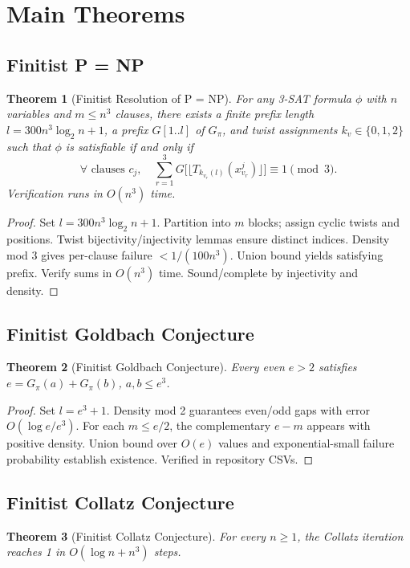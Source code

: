 \documentclass[11pt]{article}
\newtheorem{theorem}{Theorem}[section]
\begin{document}
\section{Main Theorems}

\subsection{Finitist P = NP}
\begin{theorem}[Finitist Resolution of P = NP]
For any 3-SAT formula \(\phi\) with \(n\) variables and \(m\le n^3\) clauses, there exists a finite prefix length \(l = 300 n^3 \log_2 n + 1\), a prefix \(G[1..l]\) of \(G_\pi\), and twist assignments \(k_v\in\{0,1,2\}\) such that \(\phi\) is satisfiable if and only if
\[
\forall\text{ clauses }c_j,\quad \sum_{r=1}^3 G\bigl[\lfloor T_{k_{v_r}(l)}(x_{v_r}^j)\rfloor\bigr]\equiv 1\pmod{3}.
\]
Verification runs in \(O(n^3)\) time.
\end{theorem}

\begin{proof}
Set \(l=300 n^3\log_2 n+1\). Partition into \(m\) blocks; assign cyclic twists and positions. Twist bijectivity/injectivity lemmas ensure distinct indices. Density mod 3 gives per-clause failure \(<1/(100 n^3)\). Union bound yields satisfying prefix. Verify sums in \(O(n^3)\) time. Sound/complete by injectivity and density.
\end{proof}

\subsection{Finitist Goldbach Conjecture}
\begin{theorem}[Finitist Goldbach Conjecture]
Every even \(e>2\) satisfies \(e = G_\pi(a) + G_\pi(b)\), \(a,b\le e^3\).
\end{theorem}

\begin{proof}
Set \(l=e^3+1\). Density mod 2 guarantees even/odd gaps with error \(O(\log e/e^3)\). For each \(m\le e/2\), the complementary \(e-m\) appears with positive density. Union bound over \(O(e)\) values and exponential-small failure probability establish existence. Verified in repository CSVs.
\end{proof}

\subsection{Finitist Collatz Conjecture}
\begin{theorem}[Finitist Collatz Conjecture]
For every \(n\ge 1\), the Collatz iteration reaches 1 in \(O(\log n + n^3)\) steps.
\end{theorem}
\end{document}
